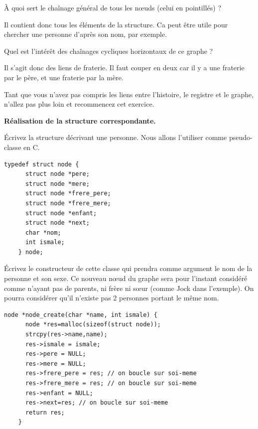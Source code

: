 \documentclass[10pt]{article}\usepackage[correction]{exemptty}
\begin{document}
\Question À quoi sert le chaînage général de tous les nœuds (celui en
pointillés) ?

\begin{Reponse}
  Il contient donc tous les éléments de la structure. Ca peut être utile pour
  chercher une personne d'après son nom, par exemple.
\end{Reponse}

\Question Quel est l'intérêt des chaînages cycliques horizontaux de ce graphe ?

\begin{Reponse}
  Il s'agit donc des liens de fraterie. Il faut couper en deux car il y a une
  fraterie par le père, et une fraterie par la mère.
\end{Reponse}

Tant que vous n'avez pas compris les liens entre l'histoire, le registre et le
graphe, n'allez pas plus loin et recommencez cet exercice.


\Exercice\textbf{Réalisation de la structure correspondante.}

\Question Écrivez la structure décrivant une personne. Nous allons l'utiliser
comme pseudo-classe en C.
\begin{Reponse}
  \begin{Verbatim}[gobble=4]
    typedef struct node {
      struct node *pere;
      struct node *mere;
      struct node *frere_pere;
      struct node *frere_mere;
      struct node *enfant;
      struct node *next;
      char *nom;
      int ismale;
    } node;
  \end{Verbatim}
\end{Reponse}

\Question Écrivez le constructeur de cette classe qui prendra comme argument le
nom de la personne et son sexe. Ce nouveau nœud du graphe sera pour l'instant
considéré comme n'ayant pas de parents, ni frère ni sœur (comme Jock dans
l'exemple). On pourra considérer qu'il n'existe pas 2 personnes portant le même
nom.

\begin{Reponse}
  \begin{Verbatim}[gobble=4]
    node *node_create(char *name, int ismale) {
      node *res=malloc(sizeof(struct node));
      strcpy(res->name,name);
      res->ismale = ismale;
      res->pere = NULL;
      res->mere = NULL;
      res->frere_pere = res; // on boucle sur soi-meme
      res->frere_mere = res; // on boucle sur soi-meme
      res->enfant = NULL;
      res->next=res; // on boucle sur soi-meme
      return res;
    }
  \end{Verbatim}
\end{Reponse}
\end{document}
